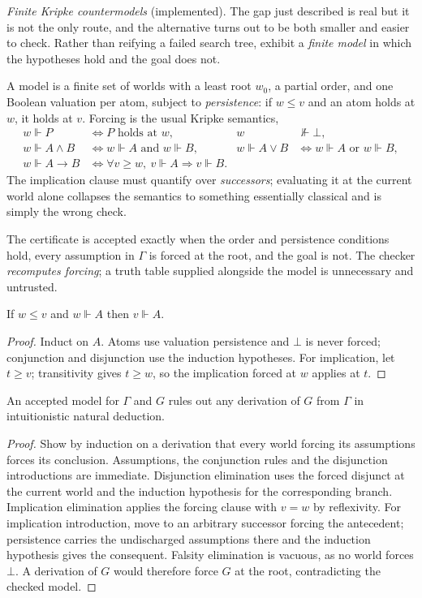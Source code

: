 \emph{Finite Kripke countermodels} (implemented). The gap just described is
real but it is not the only route, and the alternative turns out to be both
smaller and easier to check. Rather than reifying a failed search tree, exhibit
a \emph{finite model} in which the hypotheses hold and the goal does not.

A model is a finite set of worlds with a least root $w_0$, a partial order, and
one Boolean valuation per atom, subject to \emph{persistence}: if $w\le v$ and
an atom holds at $w$, it holds at $v$. Forcing is the usual Kripke semantics,
\begin{align*}
 w\Vdash P &\iff P\text{ holds at }w, &
 w&\nVdash\bot, \\
 w\Vdash A\land B &\iff w\Vdash A\text{ and }w\Vdash B, &
 w\Vdash A\lor B &\iff w\Vdash A\text{ or }w\Vdash B, \\
 w\Vdash A\to B &\iff \forall v\ge w,\ v\Vdash A\Rightarrow v\Vdash B.
\end{align*}
The implication clause must quantify over \emph{successors}; evaluating it at
the current world alone collapses the semantics to something essentially
classical and is simply the wrong check.

The certificate is accepted exactly when the order and persistence conditions
hold, every assumption in $\Gamma$ is forced at the root, and the goal is not.
The checker \emph{recomputes forcing}; a truth table supplied alongside the
model is unnecessary and untrusted.

\begin{lemma}[Persistence]
If $w\le v$ and $w\Vdash A$ then $v\Vdash A$.
\end{lemma}
\begin{proof}
Induct on $A$. Atoms use valuation persistence and $\bot$ is never forced;
conjunction and disjunction use the induction hypotheses. For implication, let
$t\ge v$; transitivity gives $t\ge w$, so the implication forced at $w$ applies
at $t$.
\end{proof}

\begin{theorem}
\label{thm:kripke}
An accepted model for $\Gamma$ and $G$ rules out any derivation of $G$ from
$\Gamma$ in intuitionistic natural deduction.
\end{theorem}
\begin{proof}
Show by induction on a derivation that every world forcing its assumptions
forces its conclusion. Assumptions, the conjunction rules and the disjunction
introductions are immediate. Disjunction elimination uses the forced disjunct
at the current world and the induction hypothesis for the corresponding branch.
Implication elimination applies the forcing clause with $v=w$ by reflexivity.
For implication introduction, move to an arbitrary successor forcing the
antecedent; persistence carries the undischarged assumptions there and the
induction hypothesis gives the consequent. Falsity elimination is vacuous, as
no world forces $\bot$. A derivation of $G$ would therefore force $G$ at the
root, contradicting the checked model.
\end{proof}

